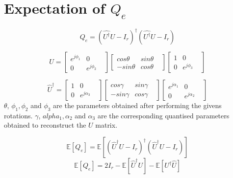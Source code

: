 \documentclass[conference]{IEEEtran}
\begin{document}
\section{Expectation of $Q_e$}
$$ Q_e = (\hat{U^\dagger}U-I_r)^\dagger (\hat{U^\dagger}U-I_r)$$

\begin{equation*}\label{eq:10}
 U =  \begin{bmatrix}
				e^{j\phi_1}& 0 &\\
				0&  e^{j\phi_2}&
	\end{bmatrix}
	\begin{bmatrix}
				cos \theta & sin \theta  &\\
				-sin \theta & cos \theta &
	\end{bmatrix}
	\begin{bmatrix}
				1& 0 &\\
				0&  e^{j\phi_3}&
	\end{bmatrix}
\end{equation*}

\begin{equation*}\label{eq:11}
\hat{U}^\dagger =
	\begin{bmatrix}
				1& 0 &\\
				0&  e^{j\alpha_3}&
	\end{bmatrix}	
	\begin{bmatrix}
				cos \gamma & sin \gamma &\\
				-sin \gamma & cos \gamma &
	\end{bmatrix}
    \begin{bmatrix}
				e^{j\alpha_1}& 0 &\\
				0&  e^{j\alpha_2}&
	\end{bmatrix}
\end{equation*}
$\theta$, $\phi_1,\phi_2$ and $\phi_3$ are the parameters obtained after performing the givens rotations. $\gamma$, $alpha_1, \alpha_2$ and $\alpha_3$ are the corresponding quantised parameters obtained to reconstruct the $U$ matrix.

\begin{equation*}\label{eq:12}
	\mathbb{E}[Q_e] = \mathbb{E}[(\hat{U}^{\dagger}U - I_r)^\dagger (\hat{U}^{\dagger}U - I_r)]
\end{equation*}
\begin{equation*}\label{eq:13}
	\mathbb{E}[Q_e] = 2I_r - \mathbb{E}[\hat{U}^{\dagger}U] - \mathbb{E}[U^{\dagger}\hat U]
\end{equation*}

%
\end{document}
